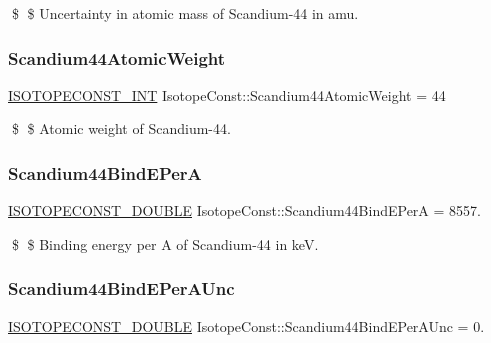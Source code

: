 \$ \$ Uncertainty in atomic mass of Scandium-\/44 in amu. \mbox{\label{group___isotope_const-_scandium-_sc44_gab3282a116fa46f5f1a032f9baa208221}} 
\subsubsection{\texorpdfstring{Scandium44\+Atomic\+Weight}{Scandium44AtomicWeight}}
{\footnotesize\ttfamily \mbox{\hyperlink{group___isotope_const-_macros_ga5f18360b3e99483a35c32d789e62621c}{I\+S\+O\+T\+O\+P\+E\+C\+O\+N\+S\+T\+\_\+\+I\+NT}} Isotope\+Const\+::\+Scandium44\+Atomic\+Weight = 44}

\$ \$ Atomic weight of Scandium-\/44. \mbox{\label{group___isotope_const-_scandium-_sc44_ga52e36f198b0723b56e323f020991d89e}} 
\subsubsection{\texorpdfstring{Scandium44\+Bind\+E\+PerA}{Scandium44BindEPerA}}
{\footnotesize\ttfamily \mbox{\hyperlink{group___isotope_const-_macros_ga8f45a7272ce02c0b4c65c44636ed719a}{I\+S\+O\+T\+O\+P\+E\+C\+O\+N\+S\+T\+\_\+\+D\+O\+U\+B\+LE}} Isotope\+Const\+::\+Scandium44\+Bind\+E\+PerA = 8557.}

\$ \$ Binding energy per A of Scandium-\/44 in keV. \mbox{\label{group___isotope_const-_scandium-_sc44_gab55351cc04066145e20d4f341255f720}} 
\subsubsection{\texorpdfstring{Scandium44\+Bind\+E\+Per\+A\+Unc}{Scandium44BindEPerAUnc}}
{\footnotesize\ttfamily \mbox{\hyperlink{group___isotope_const-_macros_ga8f45a7272ce02c0b4c65c44636ed719a}{I\+S\+O\+T\+O\+P\+E\+C\+O\+N\+S\+T\+\_\+\+D\+O\+U\+B\+LE}} Isotope\+Const\+::\+Scandium44\+Bind\+E\+Per\+A\+Unc = 0.}

